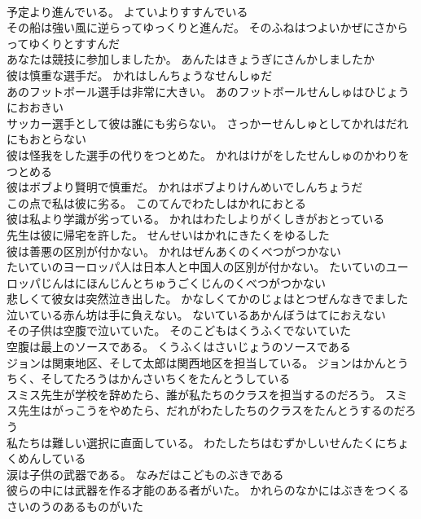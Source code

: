 \documentclass[8pt]{extreport}
\begin{document}
\begin{CJK}{UTF8}{min}
\\	予定より進んでいる。	よていよりすすんでいる 
\\	その船は強い風に逆らってゆっくりと進んだ。	そのふねはつよいかぜにさからってゆくりとすすんだ 
\\	あなたは競技に参加しましたか。	あんたはきょうぎにさんかしましたか 
\\	彼は慎重な選手だ。	かれはしんちょうなせんしゅだ 
\\	あのフットボール選手は非常に大きい。	あのフットボールせんしゅはひじょうにおおきい 
\\	サッカー選手として彼は誰にも劣らない。	さっかーせんしゅとしてかれはだれにもおとらない 
\\	彼は怪我をした選手の代りをつとめた。	かれはけがをしたせんしゅのかわりをつとめる 
\\	彼はボブより賢明で慎重だ。	かれはボブよりけんめいでしんちょうだ 
\\	この点で私は彼に劣る。	このてんでわたしはかれにおとる 
\\	彼は私より学識が劣っている。	かれはわたしよりがくしきがおとっている 
\\	先生は彼に帰宅を許した。	せんせいはかれにきたくをゆるした 
\\	彼は善悪の区別が付かない。	かれはぜんあくのくべつがつかない 
\\	たいていのヨーロッパ人は日本人と中国人の区別が付かない。	たいていのユーロッパじんはにほんじんとちゅうごくじんのくべつがつかない 
\\	悲しくて彼女は突然泣き出した。	かなしくてかのじょはとつぜんなきでました 
\\	泣いている赤ん坊は手に負えない。	ないているあかんぼうはてにおえない 
\\	その子供は空腹で泣いていた。	そのこどもはくうふくでないていた 
\\	空腹は最上のソースである。	くうふくはさいじょうのソースである 
\\	ジョンは関東地区、そして太郎は関西地区を担当している。	ジョンはかんとうちく、そしてたろうはかんさいちくをたんとうしている 
\\	スミス先生が学校を辞めたら、誰が私たちのクラスを担当するのだろう。	スミス先生はがっこうをやめたら、だれがわたしたちのクラスをたんとうするのだろう 
\\	私たちは難しい選択に直面している。	わたしたちはむずかしいせんたくにちょくめんしている 
\\	涙は子供の武器である。	なみだはこどものぶきである 
\\	彼らの中には武器を作る才能のある者がいた。	かれらのなかにはぶきをつくるさいのうのあるものがいた 

\end{CJK}
\end{document}

